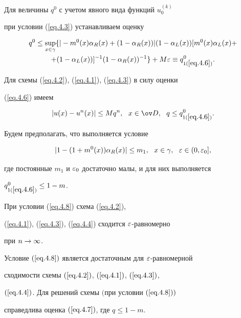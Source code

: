 Для величины $q^0$ с учетом явного вида функций $u_0^{(k)}$


при условии (\ref{eq.4.3}) устанавливаем оценку


\begin{multline} \label{eq.4.6}


q^0\leq\sup\limits_{x\in\gamma}


\{|-m^0(x)\alpha_R(x)+(1-\alpha_R(x))|


(1-\alpha_L(x))[m^0(x)\alpha_L(x)+ \\ +


(1-\alpha_L(x))]^{-1}(1-\alpha_R(x))^{-1}\}+


M\eps\eq q^0_{1(\ref{eq.4.6})}. 


\end{multline}


Для схемы (\ref{eq.4.2}), (\ref{eq.4.1}), (\ref{eq.4.3}) в силу оценки


(\ref{eq.4.6}) имеем


\begin{equation} \label{eq.4.7}


|u(x)-u^n(x)|\leq Mq^n, \ \ x\in\od, \ \ q\leq q^0_{1(\ref{eq.4.6})}.


\end{equation}





Будем предполагать, что выполняется условие


\begin{equation} \label{eq.4.8}


|1-(1+m^0(x))\alpha_R(x)|\leq m_1, \ \ x\in\gamma, \ \ \eps\in (0,\eps_0],


\end{equation}


где постоянные $m_1$ и $\varepsilon_0$ достаточно малы, и для них выполняется


$q^0_{1(\ref{eq.4.6})}\le 1-m$.


При условии (\ref{eq.4.8}) схема (\ref{eq.4.2}),


(\ref{eq.4.1}), (\ref{eq.4.3}), (\ref{eq.4.4}) сходится $\varepsilon$-равномерно


при $n\rightarrow\infty$.





\begin{thms} \label{t.4.1}


Условие $(\ref{eq.4.8})$ является достаточным для $\varepsilon$-равномерной


сходимости схемы $(\ref{eq.4.2})$, $(\ref{eq.4.1})$, $(\ref{eq.4.3})$,


$(\ref{eq.4.4})$. Для решений схемы $($при условии $(\ref{eq.4.8}))$


справедлива оценка $(\ref{eq.4.7})$, где $q\leq 1-m$.


\end{thms}








